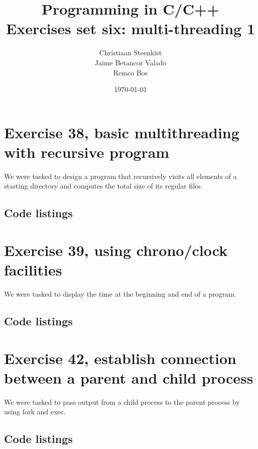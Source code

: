 \documentclass[11pt]{article}
\begin{document}
\title{Programming in C/C++ \\
       Exercises set six: multi-threading 1
}
\date{\today}
\author{Christiaan Steenkist \\
Jaime Betancor Valado \\
Remco Bos \\
}

\maketitle
\section*{Exercise 38, basic multithreading with recursive program}
We were tasked to design a program that recursively visits all elements of a starting directory and computes the total size of its regular files.

\subsection*{Code listings}





\section*{Exercise 39, using chrono/clock facilities }
We were tasked to display the time at the beginning and end of a program.

\subsection*{Code listings}


\section*{Exercise 42, establish connection between a parent and child process}
We were tasked to pass output from a child process to the parent process by using fork and exec.

\subsection*{Code listings}



\end{document}
